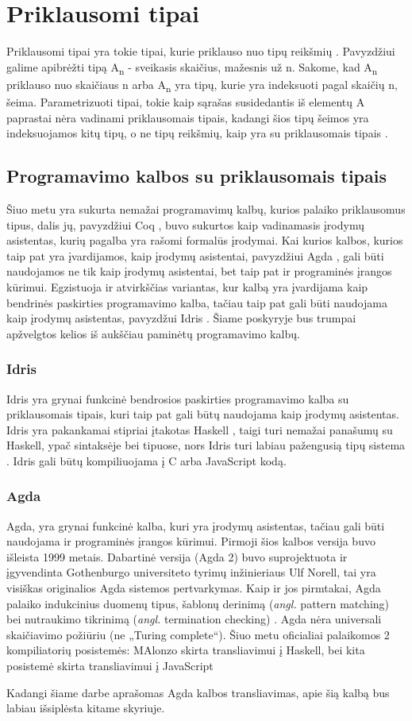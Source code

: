 \documentclass{VUMIFPSkursinis}
\begin{document}
\section{Priklausomi tipai}
Priklausomi tipai yra tokie tipai, kurie priklauso nuo tipų reikšmių \cite{depentantTypesAtWork}. Pavyzdžiui galime apibrėžti tipą A\textsubscript{n} - sveikasis skaičius, mažesnis už n. Sakome, kad A\textsubscript{n} priklauso nuo skaičiaus n arba A\textsubscript{n} yra tipų, kurie yra indeksuoti pagal skaičių n, šeima. Parametrizuoti tipai, tokie kaip sąrašas susidedantis iš elementų A paprastai nėra vadinami priklausomais tipais, kadangi šios tipų šeimos yra indeksuojamos kitų tipų, o ne tipų reikšmių, kaip yra su priklausomais tipais \cite{depentantTypesAtWork}.
\subsection{Programavimo kalbos su priklausomais tipais}
Šiuo metu yra sukurta nemažai programavimų kalbų, kurios palaiko priklausomus tipus, dalis jų, pavyzdžiui Coq \cite{coq}, buvo sukurtos kaip vadinamasis įrodymų asistentas, kurių pagalba yra rašomi formalūs įrodymai. Kai kurios kalbos, kurios taip pat yra įvardijamos, kaip įrodymų asistentai, pavyzdžiui Agda \cite{agda_book}, gali būti naudojamos ne tik kaip įrodymų asistentai, bet taip pat ir programinės įrangos kūrimui. Egzistuoja ir atvirkščias variantas, kur kalbą yra įvardijama kaip bendrinės paskirties programavimo kalba, tačiau taip pat gali būti naudojama kaip įrodymų asistentas, pavyzdžui Idris \cite{idris}. Šiame poskyryje bus trumpai apžvelgtos kelios iš aukščiau paminėtų programavimo kalbų.
\subsubsection{Idris}
Idris yra grynai funkcinė bendrosios paskirties programavimo kalba su priklausomais tipais, kuri taip pat gali būtų naudojama kaip įrodymų asistentas. Idris yra pakankamai stipriai įtakotas Haskell \cite{haskell}, taigi turi nemažai panašumų su Haskell, ypač sintaksėje bei tipuose, nors Idris turi labiau pažengusią tipų sistema \cite{idris}. Idris gali būtų kompiliuojama į C arba JavaScript kodą.
\subsubsection{Agda}
Agda, yra grynai funkcinė kalba, kuri yra įrodymų asistentas, tačiau gali būti naudojama ir programinės įrangos kūrimui. Pirmoji šios kalbos versija buvo išleista 1999 metais. Dabartinė versija (Agda 2) buvo suprojektuota ir įgyvendinta Gothenburgo universiteto tyrimų inžinieriaus Ulf Norell, tai yra visiškas originalios Agda sistemos pertvarkymas. Kaip ir jos pirmtakai, Agda palaiko indukcinius duomenų tipus, šablonų derinimą (\textit{angl.} pattern matching) bei nutraukimo tikrinimą (\textit{angl.} termination checking) \cite{agda_overview}. Agda nėra universali skaičiavimo požiūriu (ne „Turing complete“). Šiuo metu oficialiai palaikomos 2 kompiliatorių posistemės: MAlonzo skirta transliavimui į Haskell, bei kita posistemė skirta transliavimui į JavaScript \par Kadangi šiame darbe aprašomas Agda kalbos transliavimas, apie šią kalbą bus labiau išsiplėsta kitame skyriuje.
\end{document}
